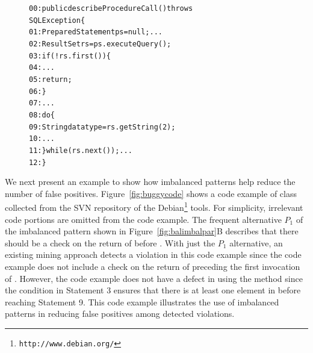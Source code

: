 \begin{figure}[t]
\begin{CodeOut}
\begin{alltt}
00:public describeProcedureCall() throws 
\hspace*{1.5in}SQLException \{
01:\hspace*{0.2in}PreparedStatement ps = null; ...
02:\hspace*{0.2in}ResultSet rs = ps.executeQuery();
03:\hspace*{0.2in}if(!rs.first())  \{
04:\hspace*{0.4in}...
05:\hspace*{0.4in}return;
06:\hspace*{0.2in}\}
07:\hspace*{0.2in}...
08:\hspace*{0.2in}do \{
09:\hspace*{0.4in}String datatype = rs.getString(2);
10:\hspace*{0.4in}...
11:\hspace*{0.2in}\} while(rs.next()); ...
12:\}
\end{alltt}
\end{CodeOut}\vspace*{-1ex}
\vspace*{-3ex}
\end{figure}

We next present an example to show how imbalanced patterns help reduce the number of false positives.  Figure~\ref{fig:buggycode} shows a code example of class  collected from the SVN repository of the Debian\footnote{\texttt{http://www.debian.org/}} tools. For simplicity, irrelevant code portions are omitted from the code example. The frequent alternative $P_1$ of the imbalanced pattern shown in Figure~\ref{fig:balimbalpar}B describes that there should be a  check on the return of  before . With just the $P_1$ alternative, an existing mining approach detects a violation in this code example since the code example does not include a  check on the return of  preceding the first invocation of . However, the code example does not have a defect in using the  method since the  condition in Statement 3 ensures that there is at least one element in  before reaching  Statement 9. This code example illustrates the use of imbalanced patterns in reducing false positives among detected violations.

